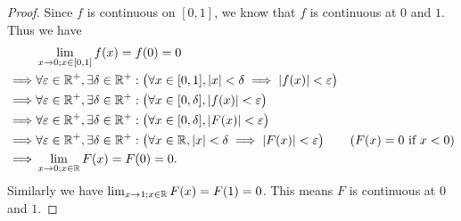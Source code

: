 \begin{proof}
  Since \(f\) is continuous on \([0, 1]\), we know that \(f\) is continuous at \(0\) and \(1\).
  Thus we have
  \begin{align*}
             & \lim_{x \to 0 ; x \in [0, 1]} f(x) = f(0) = 0                                                                                                                             \\
    \implies & \forall \varepsilon \in \mathbb{R}^+, \exists \delta \in \mathbb{R}^+ : \big(\forall x \in [0, 1], \left\lvert x\right\rvert < \delta \implies \left\lvert f(x)\right\rvert < \varepsilon\big)                                \\
    \implies & \forall \varepsilon \in \mathbb{R}^+, \exists \delta \in \mathbb{R}^+ : \big(\forall x \in [0, \delta], \left\lvert f(x)\right\rvert < \varepsilon\big)                                                     \\
    \implies & \forall \varepsilon \in \mathbb{R}^+, \exists \delta \in \mathbb{R}^+ : \big(\forall x \in [0, \delta], \left\lvert F(x)\right\rvert < \varepsilon\big)                                                     \\
    \implies & \forall \varepsilon \in \mathbb{R}^+, \exists \delta \in \mathbb{R}^+ : \big(\forall x \in \mathbb{R}, \left\lvert x\right\rvert < \delta \implies \left\lvert F(x)\right\rvert < \varepsilon\big)     & (F(x) = 0 \text{ if } x < 0) \\
    \implies & \lim_{x \to 0 ; x \in \mathbb{R}} F(x) = F(0) = 0.
  \end{align*}
  Similarly we have \(\lim_{x \to 1 ; x \in \mathbb{R}} F(x) = F(1) = 0\).
  This means \(F\) is continuous at \(0\) and \(1\).


\end{proof}
